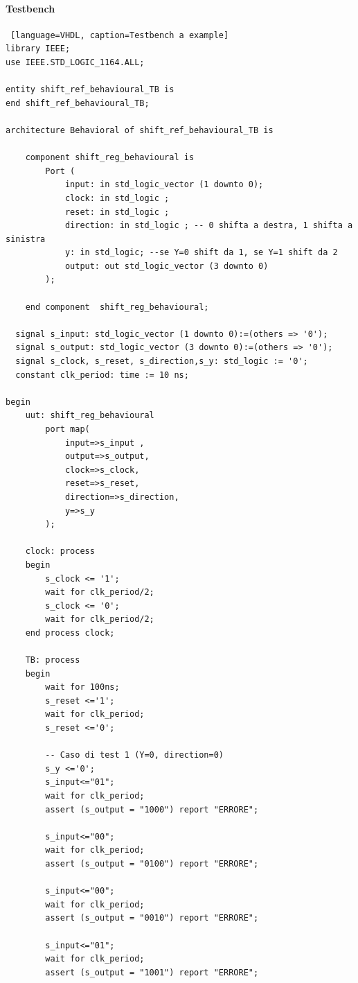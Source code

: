 \paragraph{Testbench}

\begin{lstlisting} [language=VHDL, caption=Testbench a example]
library IEEE;
use IEEE.STD_LOGIC_1164.ALL;

entity shift_ref_behavioural_TB is
end shift_ref_behavioural_TB;

architecture Behavioral of shift_ref_behavioural_TB is

    component shift_reg_behavioural is
        Port (
            input: in std_logic_vector (1 downto 0);
            clock: in std_logic ;
            reset: in std_logic ;
            direction: in std_logic ; -- 0 shifta a destra, 1 shifta a sinistra
            y: in std_logic; --se Y=0 shift da 1, se Y=1 shift da 2
            output: out std_logic_vector (3 downto 0)
        );

    end component  shift_reg_behavioural;

  signal s_input: std_logic_vector (1 downto 0):=(others => '0');
  signal s_output: std_logic_vector (3 downto 0):=(others => '0');
  signal s_clock, s_reset, s_direction,s_y: std_logic := '0';
  constant clk_period: time := 10 ns;

begin
    uut: shift_reg_behavioural
        port map(
            input=>s_input ,
            output=>s_output,
            clock=>s_clock,
            reset=>s_reset,
            direction=>s_direction,
            y=>s_y
        );

    clock: process
    begin
        s_clock <= '1';
        wait for clk_period/2;
        s_clock <= '0';
        wait for clk_period/2;
    end process clock;

    TB: process
    begin
        wait for 100ns;
        s_reset <='1';
        wait for clk_period;
        s_reset <='0';

        -- Caso di test 1 (Y=0, direction=0)
        s_y <='0';
        s_input<="01";
        wait for clk_period;
        assert (s_output = "1000") report "ERRORE";

        s_input<="00";
        wait for clk_period;
        assert (s_output = "0100") report "ERRORE";

        s_input<="00";
        wait for clk_period;
        assert (s_output = "0010") report "ERRORE";

        s_input<="01";
        wait for clk_period;
        assert (s_output = "1001") report "ERRORE";


\end{lstlisting}
